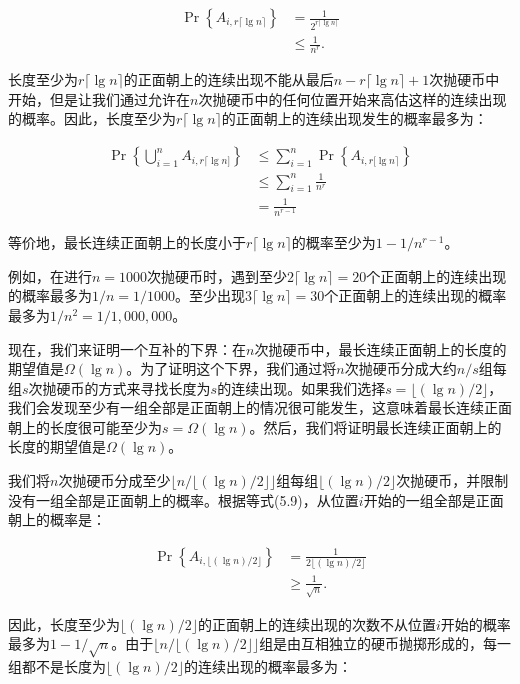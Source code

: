 \documentclass[lang=cn,newtx,10pt,scheme=chinese]{elegantbook}
\begin{document}
$$
\begin{aligned}
\operatorname{Pr}\left\{A_{i, r\lceil\lg n\rceil}\right\} & =\frac{1}{2^{r\lceil\lg n\rceil}} \\
& \leq \frac{1}{n^r} .
\end{aligned}
$$

长度至少为$r\lceil\lg n\rceil$的正面朝上的连续出现不能从最后$n-r\lceil\lg n\rceil+1$次抛硬币中开始，但是让我们通过允许在$n$次抛硬币中的任何位置开始来高估这样的连续出现的概率。因此，长度至少为$r\lceil\lg n\rceil$的正面朝上的连续出现发生的概率最多为：

$$
\begin{aligned}
\operatorname{Pr}\left\{\bigcup_{i=1}^n A_{i, r\lceil\lg n]}\right\} & \leq \sum_{i=1}^n \operatorname{Pr}\left\{A_{i, r[\lg n\rceil}\right\} \\
& \leq \sum_{i=1}^n \frac{1}{n^r} \\
& =\frac{1}{n^{r-1}}
\end{aligned}
$$

等价地，最长连续正面朝上的长度小于$r\lceil\lg n\rceil$的概率至少为$1-1/n^{r-1}$。

例如，在进行$n=1000$次抛硬币时，遇到至少$2\lceil\lg n\rceil=20$个正面朝上的连续出现的概率最多为$1/n=1/1000$。至少出现$3\lceil\lg n\rceil=30$个正面朝上的连续出现的概率最多为$1/n^2=1/1,000,000$。

现在，我们来证明一个互补的下界：在$n$次抛硬币中，最长连续正面朝上的长度的期望值是$\Omega(\lg n)$。为了证明这个下界，我们通过将$n$次抛硬币分成大约$n/s$组每组$s$次抛硬币的方式来寻找长度为$s$的连续出现。如果我们选择$s=\lfloor(\lg n) / 2\rfloor$，我们会发现至少有一组全部是正面朝上的情况很可能发生，这意味着最长连续正面朝上的长度很可能至少为$s=\Omega(\lg n)$。然后，我们将证明最长连续正面朝上的长度的期望值是$\Omega(\lg n)$。

我们将$n$次抛硬币分成至少$\lfloor n /\lfloor(\lg n) / 2\rfloor\rfloor$组每组$\lfloor(\lg n) / 2\rfloor$次抛硬币，并限制没有一组全部是正面朝上的概率。根据等式(5.9)，从位置$i$开始的一组全部是正面朝上的概率是：

$$
\begin{aligned}
\operatorname{Pr}\left\{A_{i,\lfloor(\lg n) / 2\rfloor}\right\} & =\frac{1}{2\lfloor(\lg n) / 2\rfloor} \\
& \geq \frac{1}{\sqrt{n}} .
\end{aligned}
$$

因此，长度至少为$\lfloor(\lg n) / 2\rfloor$的正面朝上的连续出现的次数不从位置$i$开始的概率最多为$1-1/\sqrt{n}$。由于$\lfloor n /\lfloor(\lg n) / 2\rfloor\rfloor$组是由互相独立的硬币抛掷形成的，每一组都不是长度为$\lfloor(\lg n) / 2\rfloor$的连续出现的概率最多为：
\end{document}
